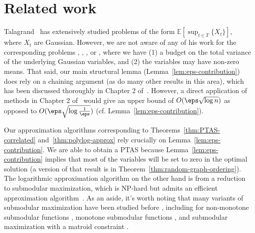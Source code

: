 \section{Related work}
\label{sbs:related}
Talagrand~\citep{talagrand} has extensively studied problems of the form $\mathbb{E}[\sup_{t\in T}\{X_t\}]$, where $X_t$ are Gaussian. However, we are not aware of any of his work for the corresponding problems \basic, \gena, \genb, or \genbcorr, where we have (1) a budget on the total variance of the underlying Gaussian variables, and (2) the variables may have non-zero means. That said, our main structural lemma (Lemma~\ref{lem:eps-contribution}) does rely on a chaining argument (as do many other results in this area), which has been discussed thoroughly in Chapter 2 of~\cite{talagrand}. However, a direct application of methods in Chapter 2 of~\cite{talagrand} would give an upper bound of $O(\eps\sqrt{\log n})$ as opposed to $O(\eps\sqrt{\log \frac{1}{\eps}})$ (cf. Lemma~\ref{lem:eps-contribution}).


Our approximation algorithms corresponding to Theorems~\ref{thm:PTAS-correlated} and~\ref{thm:polylog-approx} rely crucially on Lemma~\ref{lem:eps-contribution}. We are able to obtain a PTAS because Lemma~\ref{lem:eps-contribution} implies that most of the variables will be set to zero in the optimal solution (a version of that result is in Theorem~\ref{thm:random-graph-ordering}). The logarithmic approximation algorithm on the other hand is from a reduction to submodular maximization, which is NP-hard but admits an efficient approximation algorithm~\citep{nemhauser1978analysis}. 
As an aside, it's worth noting that many variants of submodular maximization have been studied before \citep{Vondrak13}, including for non-monotone submodular functions \citep{BuchbinderF18}, monotone submodular functions \citep{FeigeMV11}, and submodular maximization with a matroid constraint \citep{BuchbinderF24}.